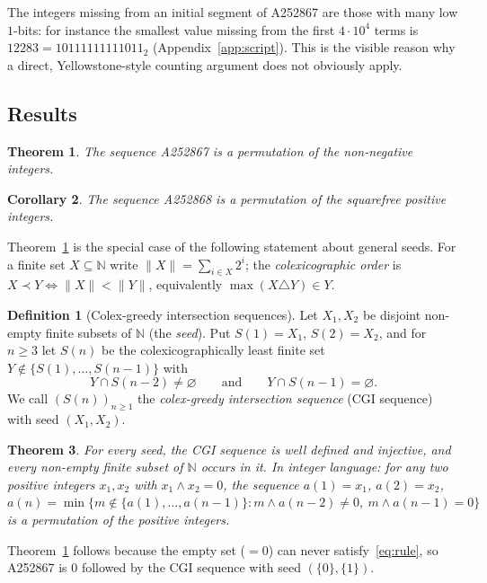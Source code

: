 \documentclass[11pt]{amsart}
\newtheorem{theorem}{Theorem}
\newtheorem{maincor}[theorem]{Corollary}
\theoremstyle{definition}
\newtheorem{definition}[lemma]{Definition}
\theoremstyle{remark}
\newcommand{\N}{\mathbb{N}}
\newcommand{\cl}{\prec}
\begin{document}
The integers missing from an initial segment of A252867 are those with many low $1$-bits:
for instance the smallest value missing from the first $4\cdot10^4$ terms is
$12283=10111111111011_2$ (Appendix~\ref{app:script}).
This is the visible reason why a direct, Yellowstone-style counting argument does not obviously
apply.

\subsection{Results}
\begin{theorem}\label{thm:main}
The sequence A252867 is a permutation of the non-negative integers.
\end{theorem}

\begin{maincor}\label{cor:sqf}
The sequence A252868 is a permutation of the squarefree positive integers.
\end{maincor}

Theorem~\ref{thm:main} is the special case of the following statement about general seeds.
For a finite set $X\subseteq\N$ write $\|X\|=\sum_{i\in X}2^i$; the \emph{colexicographic
order} is $X\cl Y\iff\|X\|<\|Y\|$, equivalently $\max(X\triangle Y)\in Y$.

\begin{definition}[Colex-greedy intersection sequences]\label{def:cgi}
Let $X_1,X_2$ be disjoint non-empty finite subsets of $\N$ (the \emph{seed}). Put $S(1)=X_1$,
$S(2)=X_2$, and for $n\ge3$ let $S(n)$ be the colexicographically least finite set
$Y\notin\{S(1),\dots,S(n-1)\}$ with
\begin{equation}\label{eq:rule}
Y\cap S(n-2)\neq\varnothing\qquad\text{and}\qquad Y\cap S(n-1)=\varnothing .
\end{equation}
We call $(S(n))_{n\ge1}$ the \emph{colex-greedy intersection sequence} (CGI sequence) with seed
$(X_1,X_2)$.
\end{definition}

\begin{theorem}\label{thm:general}
For every seed, the CGI sequence is well defined and injective, and every non-empty finite subset
of $\N$ occurs in it. In integer language: for any two positive integers $x_1,x_2$ with
$x_1\wedge x_2=0$, the sequence $a(1)=x_1$, $a(2)=x_2$,
$a(n)=\min\{m\notin\{a(1),\dots,a(n-1)\}: m\wedge a(n-2)\neq0,\ m\wedge a(n-1)=0\}$ is a
permutation of the positive integers.
\end{theorem}

Theorem~\ref{thm:main} follows because the empty set ($=0$) can never satisfy~\eqref{eq:rule},
so A252867 is $0$ followed by the CGI sequence with seed $(\{0\},\{1\})$.
\end{document}

